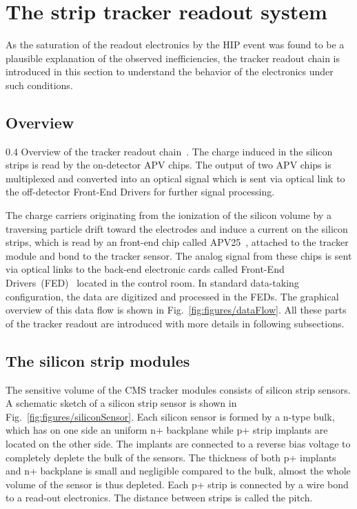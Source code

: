 \newpage

\section{The strip tracker readout system}

As the saturation of the readout electronics by the HIP event was found to be a plausible explanation of the observed inefficiencies, the tracker readout chain is introduced in this section to understand the behavior of the electronics under such conditions.


\subsection{Overview}

                 {0.4}       %
                 {Overview of the tracker readout chain~\cite{Bainbridge:2004jc}. The charge induced in the silicon strips is read by the on-detector APV chips. The output of two APV chips is multiplexed and converted into an optical signal which is sent via optical link to the off-detector Front-End Drivers for further signal processing. } %

The charge carriers originating from the ionization of the silicon volume by a traversing particle drift toward the electrodes and induce a current on the silicon strips, which is read by an front-end chip called APV25~\cite{French:2001xb}, attached to the tracker module and bond to the tracker sensor. The analog signal from these chips is sent via optical links to the back-end electronic cards called Front-End Drivers~(FED)~\cite{Baird:2002wg} located in the control room. In standard data-taking configuration, the data are digitized and processed in the FEDs. The graphical overview of this data flow is shown in Fig.~\ref{fig:figures/dataFlow}. All these parts of the tracker readout are introduced with more details in following subsections.

\subsection{The silicon strip modules}

The sensitive volume of the CMS tracker modules consists of silicon strip sensors. A schematic sketch of a silicon strip sensor is shown in Fig.~\ref{fig:figures/siliconSensor}. Each silicon sensor is formed by a n-type bulk, which has on one side an uniform n+ backplane while p+ strip implants are located on the other side. The implants are connected to a reverse bias voltage to completely deplete the bulk of the sensors. The thickness of both p+ implants and n+ backplane is small and negligible compared to the bulk, almost the whole volume of the sensor is thus depleted. Each p+ strip is connected by a wire bond to a read-out electronics. The distance between strips is called the pitch. 

